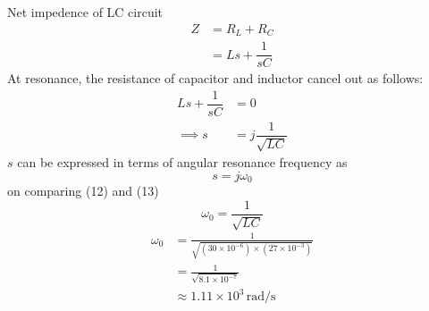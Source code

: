 \documentclass[journal,12pt,twocolumn]{IEEEtran}
\theoremstyle{remark}
\begin{document}
Net impedence of LC circuit \\
\begin{align}
Z&=R_L +R_C \\
&=Ls + \dfrac{1}{sC} 
\end{align}
At resonance, the resistance of capacitor and inductor cancel out as follows:
\begin{align}
    Ls + \dfrac{1}{sC} &= 0\\
    \implies s &= j\dfrac{1}{\sqrt{LC}} 
\end{align}
$s$ can be expressed in terms of angular resonance frequency as
\begin{equation}
    s = j\omega_0 
\end{equation}
on comparing (12) and (13)
\begin{equation}
    \omega_0 = \dfrac{1}{\sqrt{LC}}
\end{equation}
\begin{align}
\omega_0 &= \frac{1}{\sqrt{(30 \times 10^{-6}) \times (27 \times 10^{-3})}} \\
&= \frac{1}{\sqrt{8.1 \times 10^{-7}}}\\
& \approx 1.11 \times 10^{3} \, \text{rad/s}
\end{align}
\end{document}
